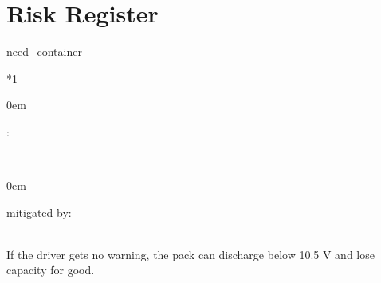 \documentclass[a4paper,10pt,english]{sphinxmanual}
\begin{document}
\chapter{Risk Register}
\label{\detokenize{requirements/risks:risk-register}}\label{\detokenize{requirements/risks::doc}}
\begin{sphinxuseclass}{need_container}

\begin{savenotes}\sphinxattablestart
\sphinxthistablewithglobalstyle
\centering
{}\label{\detokenize{requirements/risks:RISK_DEEP_DISCHARGE}}\nobreak
\begin{tabular}[t]{*{1}{}}
\sphinxtoprule
\sphinxtableatstartofbodyhook
\begin{DUlineblock}{0em}
\item[] :  
\end{DUlineblock}
\\
\sphinxhline
\begin{DUlineblock}{0em}
\item[] 
\item[] 
\item[] 
\item[] 
\item[] 
\item[] 
\item[] \item[] mitigated by: 

\end{DUlineblock}
\\
\sphinxhline
\sphinxAtStartPar
If the driver gets no warning, the pack can discharge below 10.5 V
and lose capacity for good.
\\
\sphinxbottomrule
\end{tabular}
\sphinxtableafterendhook\par
\sphinxattableend\end{savenotes}

\end{sphinxuseclass}
\end{document}
